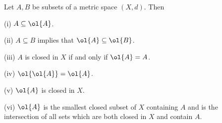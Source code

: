 \begin{proposition}\label{pro:closure_properties_metric_space}%
Let $A,B$ be subsets of a metric space $(X,d)$. Then
\ben
\item [(i)] $A\subseteq \ol{A}$.
\item [(ii)] $A \subseteq B$ implies that $\ol{A}\subseteq \ol{B}$.
\item [(iii)] $A$ is closed in $X$ if and only if $\ol{A} = A$.
\item [(iv)] $\ol{\ol{A}} = \ol{A}$.
\item [(v)] $\ol{A}$ is closed in $X$.
\item [(vi)] $\ol{A}$ is the smallest closed subset of $X$ containing $A$ and is the intersection of all sets which are both closed in $X$ and contain $A$.%
\een
\end{proposition}

